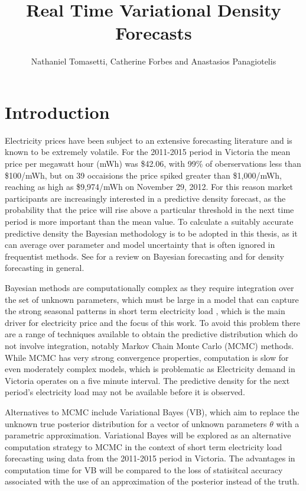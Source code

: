 \documentclass[12pt,a4paper]{article}%
\title{Real Time Variational Density Forecasts}
\author{Nathaniel Tomasetti, Catherine Forbes and Anastasios Panagiotelis}
\numberwithin{equation}{section}
\begin{document}
\maketitle
\tableofcontents
\section{Introduction} 

Electricity prices have been subject to an extensive forecasting literature and is known to be extremely volatile. For the 2011-2015 period in Victoria the mean price per megawatt hour (mWh) was \$42.06, with 99\% of oberservations less than \$100/mWh, but on 39 occaisions the price spiked greater than \$1,000/mWh, reaching as high as \$9,974/mWh on November 29, 2012. For this reason market participants are increasingly interested in a predictive density forecast, as the probability that the price will rise above a particular threshold in the next time period is more important than the mean value. To calculate a suitably accurate predictive density the Bayesian methodology is to be adopted in this thesis, as it can average over parameter and model uncertainty that is often ignored in frequentist methods. See \citet{Geweke2006} for a review on Bayesian forecasting and \citet{Gneiting2014} for density forecasting in general. 

Bayesian methods are computationally complex as they require integration over the set of unknown parameters, which must be large in a model that can capture the strong seasonal patterns in short term electricity load \citep{Taylor2003}, which is the main driver for electricity price and the focus of this work. To avoid this problem there are a range of techniques available to obtain the predictive distribution which do not involve integration, notably Markov Chain Monte Carlo (MCMC) methods. While MCMC has very strong convergence properties, computation is slow for even moderately complex models, which is problematic as Electricity demand in Victoria operates on a five minute interval. The predictive density for the next period's electricity load may not be available before it is observed.

Alternatives to MCMC include Variational Bayes (VB), which aim to replace the unknown true posterior distribution for a vector of unknown parameters $\theta$ with a parametric approximation. Variational Bayes will be explored as an alternative computation strategy to MCMC in the context of short term electricity load forecasting using data from the 2011-2015 period in Victoria. The advantages in computation time for VB will be compared to the loss of statisitcal accuracy associated with the use of an approximation of the posterior instead of the truth. 
\end{document}
